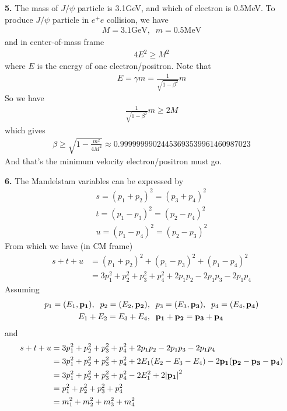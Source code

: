 \documentclass{article}
\begin{document}
{\bf5.} The mass of $J/\psi$ particle is 3.1GeV, and which of electron is 0.5MeV. To produce $J/\psi$ particle in $e^+e$ collision, we have
\begin{align*}
  M=3.1\text{GeV},\;\;m=0.5\text{MeV}
\end{align*}
and in center-of-mass frame
\begin{align*}
  4E^2\geq M^2
\end{align*}
where $E$ is the energy of one electron/positron. Note that
\begin{align*}
  E=\gamma m=\frac{1}{\sqrt{1-\beta^2}}m
\end{align*}
So we have
\begin{align*}
  \frac{1}{\sqrt{1-\beta^2}}m\geq2M
\end{align*}
which gives
\begin{align*}
  \beta\geq\sqrt{1-\frac{m^2}{4M^2}}\approx0.99999999024453693539961460987023
\end{align*}
And that's the minimum velocity electron/positron must go.

{\bf6.} The Mandelstam variables can be expressed by
\begin{align}
  s=(p_1+p_2)^2=(p_3+p_4)^2\\
  t=(p_1-p_3)^2=(p_2-p_4)^2\\
  u=(p_1-p_4)^2=(p_2-p_3)^2
\end{align}
From which we have (in CM frame)
\begin{align*}
  s+t+u&=(p_1+p_2)^2+(p_1-p_3)^2+(p_1-p_4)^2\\
  &=3p_1^2+p_2^2+p_3^2+p_4^2+2p_1p_2-2p_1p_3-2p_1p_4
\end{align*}
Assuming
\begin{align*}
  p_1=(E_1,\vb{p_1}),\;\;p_2=(E_2,\vb{p_2})&,\;\;p_3=(E_3,\vb{p_3}),\;\;p_4=(E_4,\vb{p_4})\\
  E_1+E_2=E_3+E_4&,\;\;\vb{p_1}+\vb{p_2}=\vb{p_3}+\vb{p_4}
\end{align*}
and
\begin{align*}
  s+t+u&=3p_1^2+p_2^2+p_3^2+p_4^2+2p_1p_2-2p_1p_3-2p_1p_4\\
  &=3p_1^2+p_2^2+p_3^2+p_4^2+2E_1(E_2-E_3-E_4)-2\vb{p_1}(\vb{p_2}-\vb{p_3}-\vb{p_4})\\
  &=3p_1^2+p_2^2+p_3^2+p_4^2-2E_1^2+2\abs{\vb{p_1}}^2\\
  &=p_1^2+p_2^2+p_3^2+p_4^2\\
  &=m_1^2+m_2^2+m_3^2+m_4^2
\end{align*}
\end{document}
